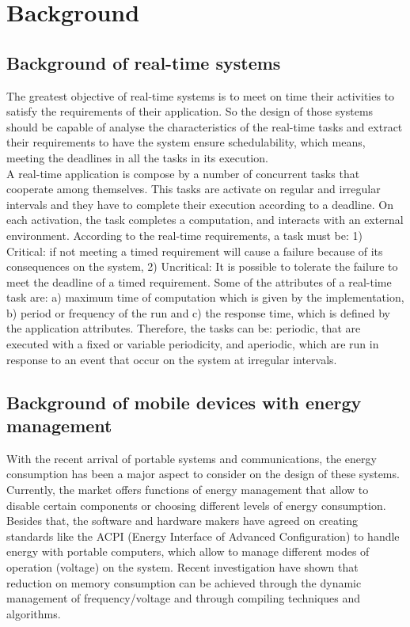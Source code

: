 \documentclass[conference]{IEEEtran}
\begin{document}
\section{Background}
\subsection{Background of real-time systems}
The greatest objective of real-time systems is to meet on time their activities to satisfy the requirements of their application. So the design of those systems should be capable of analyse the characteristics of the real-time tasks and extract their requirements to have the system ensure schedulability, which means, meeting the deadlines in all the tasks in its execution.\\
A real-time application is compose by a number of concurrent tasks that cooperate among themselves.  This tasks are activate  on regular and irregular intervals and they have to complete their execution according to a deadline. On each activation, the task completes a computation, and interacts with an external environment. According to the real-time requirements, a task must be: 1) Critical: if not meeting a timed requirement will cause a failure because of its consequences on the system, 2) Uncritical: It is possible to tolerate the failure to meet the deadline of a timed requirement. Some of the attributes of a real-time task are: a) maximum time of computation which is given by the implementation, b) period or frequency of the run and c) the response time, which is defined by the application attributes. Therefore, the tasks can be: periodic, that are executed with a fixed or variable periodicity, and aperiodic, which are run in response to an event that occur on the system at irregular intervals.
 
 \subsection{Background of mobile devices with energy management}

 With the recent arrival of portable systems and communications, the energy consumption has been a major aspect to consider on the design of these systems. Currently, the market offers functions of energy management that allow to disable certain components or choosing different levels of energy consumption. Besides that, the software and hardware makers have agreed on creating standards like the ACPI (Energy Interface of Advanced Configuration) to handle energy with portable computers, which allow to manage different modes of operation (voltage) on the system. Recent investigation have shown that reduction on memory consumption can be achieved through the dynamic management of frequency/voltage and through compiling techniques and algorithms.
 
\end{document}
